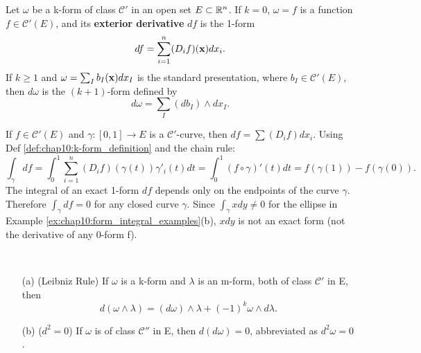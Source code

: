 \begin{definition}
  \label{def:chap10:exterior_derivative}
  Let $\omega$ be a k-form of class $\mathcal{C}'$ in an open set $E
  \subset \mathbb{R}^n$.
  If $k=0$, $\omega = f$ is a function $f \in \mathcal{C}'(E)$, and
  its \textbf{exterior derivative} $df$ is the 1-form
  \[
    df = \sum_{i=1}^n (D_i f)(\mathbf{x}) dx_i.
  \]
  If $k \ge 1$ and $\omega = \sum_I b_I(\mathbf{x}) dx_I$ is the
  standard presentation, where $b_I \in \mathcal{C}'(E)$, then
  $d\omega$ is the $(k+1)$-form defined by
  \[
    d\omega = \sum_I (db_I) \wedge dx_I.
  \]
\end{definition}

\begin{example}
  \label{ex:chap10:integral_exact_1form}
  If $f \in \mathcal{C}'(E)$ and $\gamma: [0, 1] \to E$ is a
  $\mathcal{C}'$-curve, then $df = \sum (D_i f) dx_i$. Using Def
  \ref{def:chap10:k-form_definition} and the chain rule:
  \[
    \int_\gamma df = \int_0^1 \sum_{i=1}^n (D_i f)(\gamma(t))
    \gamma'_i(t) dt = \int_0^1 (f \circ \gamma)'(t) dt = f(\gamma(1))
    - f(\gamma(0)).
  \]
  The integral of an exact 1-form $df$ depends only on the endpoints
  of the curve $\gamma$. Therefore $\int_\gamma df = 0$ for any
  closed curve $\gamma$. Since $\int_\gamma x dy \ne 0$ for the
  ellipse in Example \ref{ex:chap10:form_integral_examples}(b), $x
  dy$ is not an exact form (not the derivative of any 0-form f).
\end{example}

\begin{theorem}
  \label{thm:chap10:properties_exterior_derivative}
  ~ %
  \begin{enumerate}
    \item[(a)] (Leibniz Rule) If $\omega$ is a k-form and $\lambda$
      is an m-form, both of class $\mathcal{C}'$ in E, then
      \[
        d(\omega \wedge \lambda) = (d\omega) \wedge \lambda + (-1)^k
        \omega \wedge d\lambda.
      \]
    \item[(b)] ($d^2=0$) If $\omega$ is of class $\mathcal{C}''$ in
      E, then $d(d\omega) = 0$, abbreviated as $d^2\omega = 0$.
  \end{enumerate}
\end{theorem}

